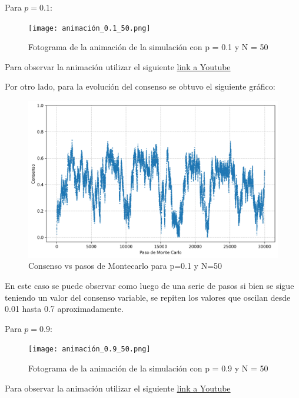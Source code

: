 \documentclass[12pt]{article}
\begin{document}
Para $p = 0.1$:

\begin{figure}[H]
    \centering
    \texttt{[image: animación\_0.1\_50.png]} 
    \caption{Fotograma de la animación de la simulación con p = 0.1 y N = 50}
\end{figure}

Para observar la animación utilizar el siguiente \href{https://www.youtube.com/watch?v=dQw4w9WgXcQ}{link a Youtube}

Por otro lado, para la evolución del consenso se obtuvo el siguiente gráfico:
\begin{figure}[H]
    \centering
    \includegraphics[width=1\textwidth]{consensus_evolution_n_50_p_0.1.png} 
    \caption{Consenso vs pasos de Montecarlo para p=0.1 y N=50}
\end{figure}

En este caso se puede observar como luego de una serie de pasos si bien se sigue teniendo un valor del consenso variable, se repiten los valores que oscilan desde 0.01 hasta 0.7 aproximadamente. 

Para $p = 0.9$:

\begin{figure}[H]
    \centering
    \texttt{[image: animación\_0.9\_50.png]} 
    \caption{Fotograma de la animación de la simulación con p = 0.9 y N = 50}
\end{figure}

Para observar la animación utilizar el siguiente \href{https://www.youtube.com/watch?v=dQw4w9WgXcQ}{link a Youtube}
\end{document}
